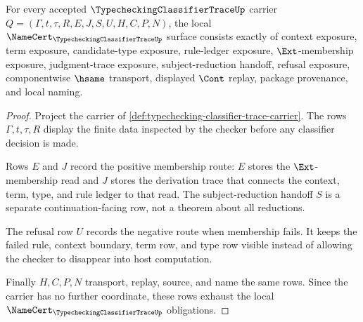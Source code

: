 \begin{theorem}
\label{thm:typechecking-classifier-trace-namecert-obligations}
For every accepted $\TypecheckingClassifierTraceUp$ carrier $Q=(\Gamma,t,\tau,R,E,J,S,U,H,C,P,N)$, the local $\NameCert_{\TypecheckingClassifierTraceUp}$ surface consists exactly of context exposure, term exposure, candidate-type exposure, rule-ledger exposure, $\Ext$-membership exposure, judgment-trace exposure, subject-reduction handoff, refusal exposure, componentwise $\hsame$ transport, displayed $\Cont$ replay, package provenance, and local naming.
\end{theorem}
\begin{proof}
Project the carrier of \autoref{def:typechecking-classifier-trace-carrier}. The rows $\Gamma,t,\tau,R$ display the finite data inspected by the checker before any classifier decision is made.

Rows $E$ and $J$ record the positive membership route: $E$ stores the $\Ext$-membership read and $J$ stores the derivation trace that connects the context, term, type, and rule ledger to that read. The subject-reduction handoff $S$ is a separate continuation-facing row, not a theorem about all reductions.

The refusal row $U$ records the negative route when membership fails. It keeps the failed rule, context boundary, term row, and type row visible instead of allowing the checker to disappear into host computation.

Finally $H,C,P,N$ transport, replay, source, and name the same rows. Since the carrier has no further coordinate, these rows exhaust the local $\NameCert_{\TypecheckingClassifierTraceUp}$ obligations.
\end{proof}

